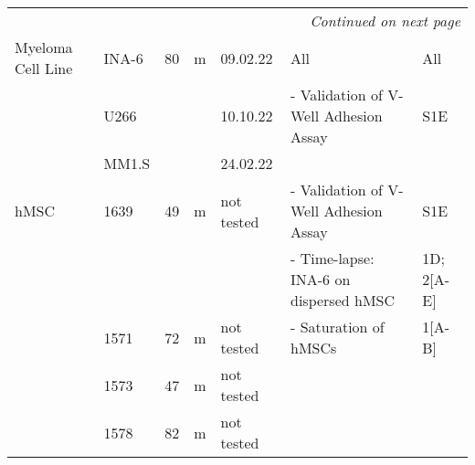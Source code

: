 {\begin{longtable}{|p{1.5cm}|p{1cm}|p{1cm}|p{1cm}|p{2cm}|p{6cm}|p{1.7cm}|}
        \hline \multicolumn{7}{r}{\textit{Continued on next page}}                                                                                                                                                                                                        \\
        \endfoot
        \endlastfoot
        Myeloma Cell Line  & INA-6                 & 80                  & m                  & 09.02.22                                  & All                                                                                                      & All                \\
                           & U266                  &                     &                    & 10.10.22                                  & - Validation of V-Well Adhesion Assay                                                                    & S1E                \\
                           & MM1.S                 &                     &                    & 24.02.22                                  &                                                                                                          &                    \\
        hMSC               & 1639                  & 49                  & m                  & not tested                                & - Validation of V-Well Adhesion Assay                                                                    & S1E                \\
                           &                       &                     &                    &                                           & - Time-lapse: INA-6 on dispersed hMSC                                                                    & 1D; 2[A-E]         \\
                           & 1571                  & 72                  & m                  & not tested                                & - Saturation of hMSCs                                                                                    & 1[A-B]             \\
                           & 1573                  & 47                  & m                  & not tested                                &                                                                                                          &                    \\
                           & 1578                  & 82                  & m                  & not tested                                &                                                                                                          &                    \\

\end{longtable}}
